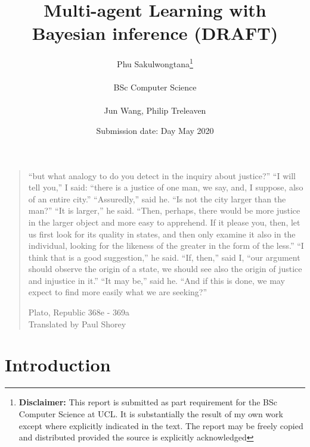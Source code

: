 \documentclass{report}
\title{{{\Huge Multi-agent Learning with Bayesian inference (DRAFT)}}\\
}
\date{Submission date: Day May 2020}
\author{Phu Sakulwongtana\thanks{
{\bf Disclaimer:}
This report is submitted as part requirement for the BSc Computer Science at UCL. It is
substantially the result of my own work except where explicitly indicated in the text.
The report may be freely copied and distributed provided the source is explicitly acknowledged
}
\\ \\
BSc Computer Science\\ \\
Jun Wang, Philip Treleaven}
\newcommand{\correctquote}[1]{``#1''}
\newenvironment{outline} {\renewcommand\abstractname{}\begin{abstract}} {\end{abstract}}
\begin{document}
 
\onehalfspacing
\maketitle

\begin{abstract}

\end{abstract}

\clearpage
\vspace*{\fill}
\thispagestyle{empty} %
\begin{quotation}
\correctquote{but what analogy to do you detect in the inquiry about justice?} \correctquote{I will tell you,} I said: \correctquote{there is a justice of one man, we say, and, I suppose, also of an entire city.} \correctquote{Assuredly,} said he. \correctquote{Is not the city larger than the man?} \correctquote{It is larger,} he said. \correctquote{Then, perhaps, there would be more justice in the larger object and more easy to apprehend. If it please you, then, let us first look for its quality in states, and then only examine it also in the individual, looking for the likeness of the greater in the form of the less.} \correctquote{I think that is a good suggestion,} he said. \correctquote{If, then,} said I, \correctquote{our argument should observe the origin of a state, we should see also the origin of justice and injustice in it.} \correctquote{It may be,} said he. \correctquote{And if this is done, we may expect to find more easily what we are seeking?}

\medskip
\raggedleft
Plato, Republic 368e - 369a \\
Translated by Paul Shorey \cite{gregory_crane}
\end{quotation}
\vspace*{\fill}

\setcounter{tocdepth}{1}
\tableofcontents

% 

\setcounter{page}{1}


\chapter{Introduction}

\end{document}
